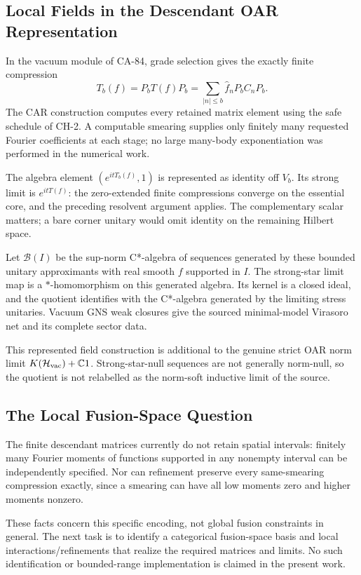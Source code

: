 \subsection{Local Fields in the Descendant OAR Representation}

In the vacuum module of CA-84, grade selection gives the exactly finite
compression
\[
 T_b(f)=P_bT(f)P_b
       =\sum_{|n|\le b}\widehat f_n P_bC_nP_b.
\]
The CAR construction computes every retained matrix element using the safe
schedule of CH-2. A computable smearing supplies only finitely many requested
Fourier coefficients at each stage; no large many-body exponentiation was
performed in the numerical work.

The algebra element $(e^{itT_b(f)},1)$ is represented as identity off $V_b$.
Its strong limit is $e^{itT(f)}$: the zero-extended finite compressions
converge on the essential core, and the preceding resolvent argument applies.
The complementary scalar matters; a bare corner unitary would omit identity
on the remaining Hilbert space.

Let $\mathcal B(I)$ be the sup-norm C*-algebra of sequences generated by
these bounded unitary approximants with real smooth $f$ supported in $I$.
The strong-star limit map is a $*$-homomorphism on this generated algebra.
Its kernel is a closed ideal, and the quotient identifies with the C*-algebra
generated by the limiting stress unitaries. Vacuum GNS weak closures give
the sourced minimal-model Virasoro net and its complete sector data.

This represented field construction is additional to the genuine strict
OAR norm limit $K(\mathcal H_{\rm vac})+\mathbb C1$. Strong-star-null
sequences are not generally norm-null, so the quotient is not relabelled
as the norm-soft inductive limit of the source.

\subsection{The Local Fusion-Space Question}

The finite descendant matrices currently do not retain spatial intervals:
finitely many Fourier moments of functions supported in any nonempty
interval can be independently specified. Nor can refinement preserve every
same-smearing compression exactly, since a smearing can have all low
moments zero and higher moments nonzero.

These facts concern this specific encoding, not global fusion constraints
in general. The next task is to identify a categorical fusion-space basis
and local interactions/refinements that realize the required matrices and
limits. No such identification or bounded-range implementation is claimed
in the present work.
